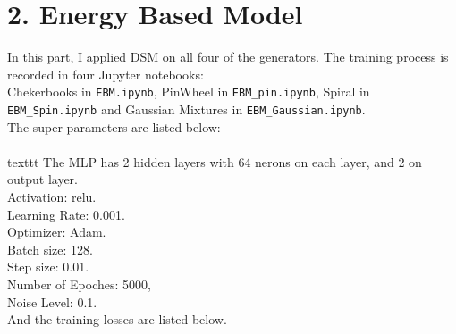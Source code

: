 \documentclass[11pt]{article}
\begin{document}
	\section*{2. Energy Based Model}
	In this part, I applied DSM on all four of the generators. 
	The training process is recorded in four Jupyter notebooks:\\ Chekerbooks in \texttt{EBM.ipynb}, PinWheel in \texttt{EBM\_pin.ipynb}, Spiral in \texttt{EBM\_Spin.ipynb} and Gaussian Mixtures in \texttt{EBM\_Gaussian.ipynb}. \\
	The super parameters are listed below:\\
	\\texttt{
		The MLP has 2 hidden layers with 64 nerons on each layer, and 2 on output layer. \\
		Activation: relu.\\
		Learning Rate: 0.001.\\
		Optimizer: Adam.\\
		Batch size: 128.\\
		Step size: 0.01.\\
		Number of Epoches: 5000,\\
		Noise Level: 0.1.\\}
	And the training losses are listed below. 
\end{document}
